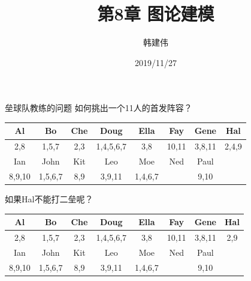 \documentclass[UTF8]{ctexbeamer}
\title{第8章 图论建模}
\author{韩建伟}
\institute{
  信息学院\\
  \texttt{hanjianwei@zjgsu.edu.cn}
}
\date{2019/11/27}
\begin{document}
\begin{frame}[plain]
  \titlepage{}
\end{frame}

\begin{frame}{垒球队教练的问题}
  如何挑出一个11人的首发阵容？

  \begin{table}
    \centering
    \begin{tabular}{c|c|c|c|c|c|c|c}
      \hline
      Al & Bo & Che & Doug & Ella & Fay & Gene & Hal\\
      \hline
      2,8 & 1,5,7 & 2,3 & 1,4,5,6,7 & 3,8 & 10,11 & 3,8,11 & 2,4,9\\
      \hline
      Ian & John & Kit & Leo & Moe & Ned & Paul & \\
      \hline
      8,9,10 & 1,5,6,7 & 8,9 & 3,9,11 & 1,4,6,7 && 9,10 &\\
      \hline
    \end{tabular}
  \end{table}

  如果Hal不能打二垒呢？

  \begin{table}
    \centering
    \begin{tabular}{c|c|c|c|c|c|c|c}
      \hline
      Al & Bo & Che & Doug & Ella & Fay & Gene & Hal\\
      \hline
      2,8 & 1,5,7 & 2,3 & 1,4,5,6,7 & 3,8 & 10,11 & 3,8,11 & 2,9\\
      \hline
      Ian & John & Kit & Leo & Moe & Ned & Paul & \\
      \hline
      8,9,10 & 1,5,6,7 & 8,9 & 3,9,11 & 1,4,6,7 && 9,10 &\\
      \hline
    \end{tabular}
  \end{table}

\end{frame}
\end{document}

